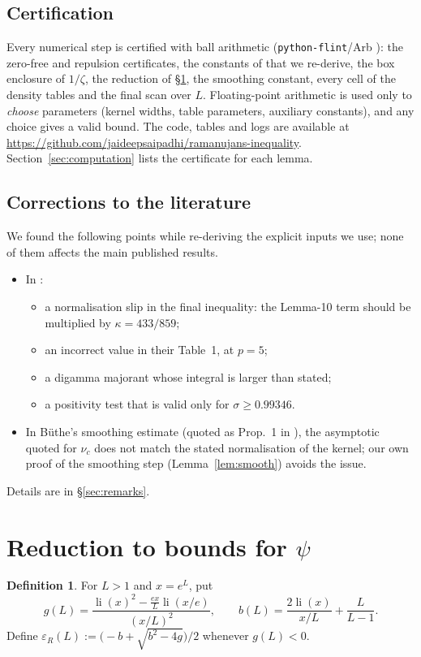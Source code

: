 \documentclass[11pt]{amsart}
\numberwithin{equation}{section}
\theoremstyle{definition}
\newtheorem{definition}[theorem]{Definition}
\theoremstyle{remark}
\newcommand{\li}{\operatorname{li}}
\newcommand{\eps}{\varepsilon}
\newcommand{\code}[1]{\texttt{#1}}
\begin{document}
\subsection*{Certification}
Every numerical step is certified with ball arithmetic (\code{python-flint}/Arb \cite{arb}): the zero-free and repulsion certificates, the constants of \cite{BTY} that we re-derive, the box enclosure of $1/\zeta$, the reduction of \S\ref{sec:reduction}, the smoothing constant, every cell of the density tables and the final scan over $L$.
Floating-point arithmetic is used only to \emph{choose} parameters (kernel widths, table parameters, auxiliary constants), and any choice gives a valid bound.
The code, tables and logs are available at \url{https://github.com/jaideepsaipadhi/ramanujans-inequality}.
Section~\ref{sec:computation} lists the certificate for each lemma.

\subsection*{Corrections to the literature}
We found the following points while re-deriving the explicit inputs we use; none of them affects the main published results.
\begin{itemize}
\item In \cite{BTY}:
  \begin{itemize}
  \item a normalisation slip in the final inequality: the Lemma-10 term should be multiplied by $\kappa = 433/859$;
  \item an incorrect value in their Table~1, at $p = 5$;
  \item a digamma majorant whose integral is larger than stated;
  \item a positivity test that is valid only for $\sigma \ge 0.99346$.
  \end{itemize}
\item In B\"uthe's smoothing estimate \cite[Prop.~4]{Buthe2016} (quoted as Prop.~1 in \cite{Buthe2018}), the asymptotic quoted for $\nu_c$ does not match the stated normalisation of the kernel; our own proof of the smoothing step (Lemma~\ref{lem:smooth}) avoids the issue.
\end{itemize}
Details are in \S\ref{sec:remarks}.
\section{Reduction to bounds for $\psi$}\label{sec:reduction}

\begin{definition}\label{def:epsR}
For $L > 1$ and $x = e^L$, put
\[
g(L) = \frac{\li(x)^2 - \frac{e x}{L}\li(x/e)}{(x/L)^2}, \qquad b(L) = \frac{2\li(x)}{x/L} + \frac{L}{L-1}.
\]
Define $\eps_R(L) := \big(-b + \sqrt{b^2 - 4g}\big)/2$ whenever $g(L) < 0$.
\end{definition}
\end{document}
